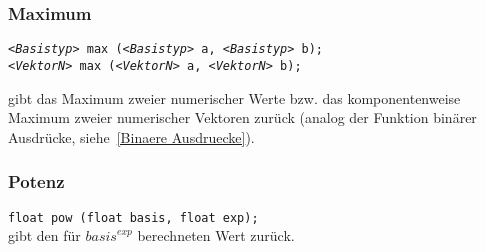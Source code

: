 \subsubsection{Maximum}

\texttt{\emph{<Basistyp>} max (\emph{<Basistyp>} a, \emph{<Basistyp>} b);}\\
\texttt{\emph{<VektorN>} max (\emph{<VektorN>} a, \emph{<VektorN>} b);}

 gibt das Maximum zweier numerischer Werte bzw. das komponentenweise
Maximum zweier numerischer Vektoren zurück (analog der Funktion binärer Ausdrücke,
siehe~\ref{Binaere Ausdruecke}).

\subsubsection{Potenz}

\texttt{float pow (float basis, float exp);}\\

 gibt den für $\mathit{basis}^\mathit{exp}$ berechneten Wert zurück.
